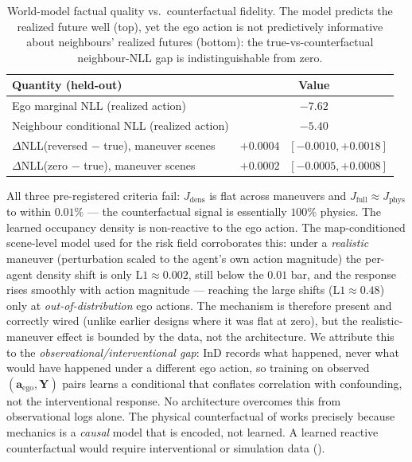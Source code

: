 \documentclass[journal]{IEEEtran}
\begin{document}
\begin{table}[h]
\caption{World-model factual quality vs.\ counterfactual fidelity. The model predicts the realized future well (top), yet the ego action is not predictively informative about neighbours' realized futures (bottom): the true-vs-counterfactual neighbour-NLL gap is indistinguishable from zero.}
\label{tab:wmfidelity}
\centering
\footnotesize
\begin{tabularx}{\columnwidth}{l c}
\toprule
\textbf{Quantity (held-out)} & \textbf{Value} \\
\midrule
Ego marginal NLL (realized action)        & $-7.62$ \\
Neighbour conditional NLL (realized action) & $-5.40$ \\
\midrule
$\Delta$NLL(reversed $-$ true), maneuver scenes & $+0.0004$ \ {\footnotesize$[-0.0010,+0.0018]$} \\
$\Delta$NLL(zero $-$ true), maneuver scenes     & $+0.0002$ \ {\footnotesize$[-0.0005,+0.0008]$} \\
\bottomrule
\end{tabularx}
\end{table}

All three pre-registered criteria fail: $J_{\mathrm{dens}}$ is flat across maneuvers and $J_{\mathrm{full}}\!\approx\!J_{\mathrm{phys}}$ to within $0.01\%$ --- the counterfactual signal is essentially $100\%$ physics. The learned occupancy density is non-reactive to the ego action. The map-conditioned scene-level model used for the risk field corroborates this: under a \emph{realistic} maneuver (perturbation scaled to the agent's own action magnitude) the per-agent density shift is only $\mathrm{L1}\!\approx\!0.002$, still below the $0.01$ bar, and the response rises smoothly with action magnitude --- reaching the large shifts ($\mathrm{L1}\!\approx\!0.48$) only at \emph{out-of-distribution} ego actions. The mechanism is therefore present and correctly wired (unlike earlier designs where it was flat at zero), but the realistic-maneuver effect is bounded by the data, not the architecture. We attribute this to the \emph{observational/interventional gap}: InD records what happened, never what would have happened under a different ego action, so training on observed $(\mathbf{a}_{\mathrm{ego}},\mathbf{Y})$ pairs learns a conditional that conflates correlation with confounding, not the interventional response. No architecture overcomes this from observational logs alone. The physical counterfactual of  works precisely because mechanics is a \emph{causal} model that is encoded, not learned. A learned reactive counterfactual would require interventional or simulation data ().
\end{document}
